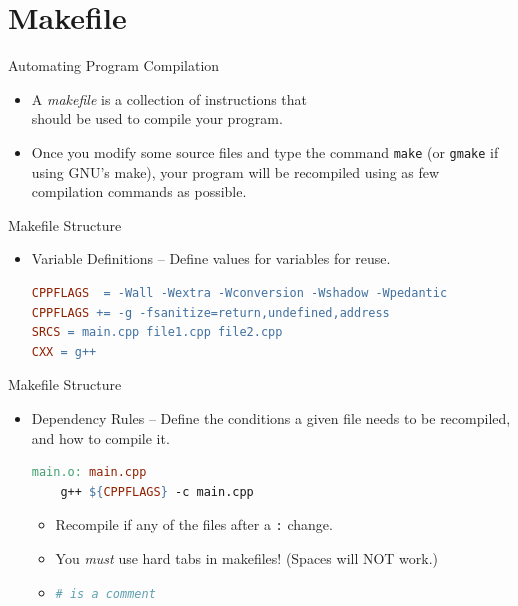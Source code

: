 \documentclass[14pt,aspectratio=1610]{beamer}
\begin{document}
\section{Makefile}


\begin{frame}{Automating Program Compilation}
\begin{itemize}
\item A \emph{makefile} is a collection of instructions that \\ should be used to compile your program.
\item Once you modify some source files and type the command \texttt{make} (or \texttt{gmake} if using GNU's make), your program will be recompiled using as few compilation commands as possible.
\end{itemize}
\end{frame}


\begin{frame}[fragile]{Makefile Structure}
\begin{itemize}
\item Variable Definitions -- Define values for variables for reuse.
\begin{lstlisting}[language=make]
CPPFLAGS  = -Wall -Wextra -Wconversion -Wshadow -Wpedantic
CPPFLAGS += -g -fsanitize=return,undefined,address
SRCS = main.cpp file1.cpp file2.cpp
CXX = g++
\end{lstlisting}
\end{itemize}
\end{frame}

\begin{frame}[fragile]{Makefile Structure}
\begin{itemize}[<+->]
\item Dependency Rules -- Define the conditions a given file needs to be recompiled, and how to compile it.
\begin{lstlisting}[language=make]
main.o: main.cpp
    g++ ${CPPFLAGS} -c main.cpp
\end{lstlisting}

\begin{itemize}
\item Recompile if any of the files after a \lstinline{:} change.
\item You \textit{must} use hard tabs in makefiles! (Spaces will NOT work.)
\item \lstinline[language=make]{# is a comment}
\end{itemize}
\end{itemize}
\end{frame}
\end{document}
